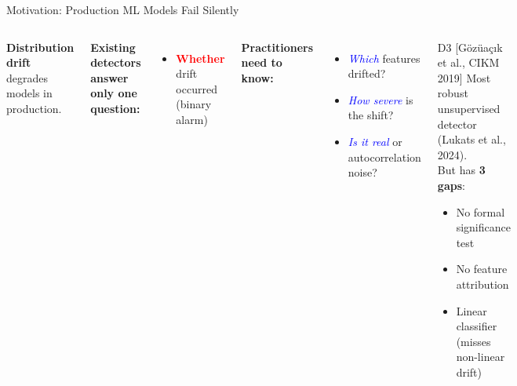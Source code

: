 \documentclass[aspectratio=169,10pt]{beamer}
\begin{document}
\begin{frame}{Motivation: Production ML Models Fail Silently}
\begin{columns}[T]
\textbf{Distribution drift} degrades models in production.

\medskip

\textbf{Existing detectors answer only one question:}
\begin{itemize}
  \item \textcolor{red}{\textbf{Whether}} drift occurred (binary alarm)
\end{itemize}

\medskip

\textbf{Practitioners need to know:}
\begin{itemize}
  \item \textcolor{blue}{\textit{Which}} features drifted?
  \item \textcolor{blue}{\textit{How severe}} is the shift?
  \item \textcolor{blue}{\textit{Is it real}} or autocorrelation noise?
\end{itemize}

\begin{block}{D3 [Gözüaçık et al., CIKM 2019]}
Most robust unsupervised detector (Lukats et al., 2024). \\[2pt]
But has \textbf{3 gaps}:
\begin{itemize}\small
  \item No formal significance test
  \item No feature attribution
  \item Linear classifier (misses non-linear drift)
\end{itemize}
\end{block}
\end{columns}
\end{frame}
\end{document}
